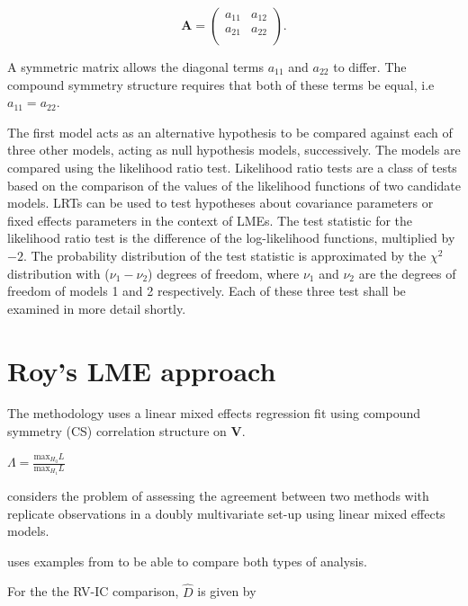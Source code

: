 \documentclass[12pt, a4paper]{article}
\theoremstyle{plain}
\theoremstyle{definition}
\theoremstyle{remark}
\begin{document}
\[
\boldsymbol{A} = \left( \begin{array}{cc}
    a_{11} & a_{12}  \\
    a_{21} & a_{22}  \\
    \end{array}\right).
\]

A symmetric matrix allows the diagonal terms $a_{11}$ and $a_{22}$ to differ. The compound symmetry structure requires that both of these terms be equal, i.e $a_{11} = a_{22}$.

The first model acts as an alternative hypothesis to be compared against each of three other models, acting as null hypothesis models, successively. The models are compared using the likelihood ratio test. Likelihood ratio tests are a class of tests based on the comparison of the values of the likelihood functions of two candidate models. LRTs can be used to test hypotheses about covariance parameters or fixed effects parameters in the context of LMEs. The test statistic for the likelihood ratio test is the difference of the log-likelihood functions, multiplied by $-2$.
The probability distribution of the test statistic is approximated by the $\chi^2$ distribution with ($\nu_{1} - \nu_{2}$) degrees of freedom, where $\nu_{1}$ and $\nu_{2}$ are the degrees of freedom of models 1 and 2 respectively. Each of these three test shall be examined in more detail shortly.
\section{Roy's LME approach}

\newpage



The methodology uses a linear mixed effects regression fit using
compound symmetry (CS) correlation structure on \textbf{V}.


$\Lambda = \frac{\mbox{max}_{H_{0}}L}{\mbox{max}_{H_{1}}L}$

\newpage

\citet{ARoy2009} considers the problem of assessing the agreement
between two methods with replicate observations in a doubly
multivariate set-up using linear mixed effects models.


\citet{ARoy2009} uses examples from \citet{BA86} to be able to
compare both types of analysis.



For the the RV-IC comparison, $\hat{D}$ is given by
\end{document}
